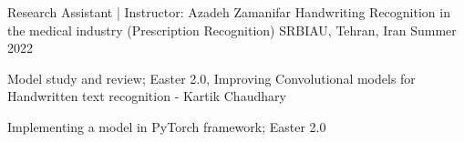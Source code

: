 


\begin{cventries}


\cventry
{Research Assistant | Instructor: Azadeh Zamanifar} %
{Handwriting Recognition in the medical industry (Prescription Recognition)} %
{SRBIAU, Tehran, Iran} %
{Summer 2022} %
{ %
\begin{cvitems}
\item {Model study and review; Easter 2.0, Improving Convolutional models for Handwritten text recognition - Kartik Chaudhary}
\item {Implementing a model in PyTorch framework; Easter 2.0}
\end{cvitems}
}


\end{cventries}